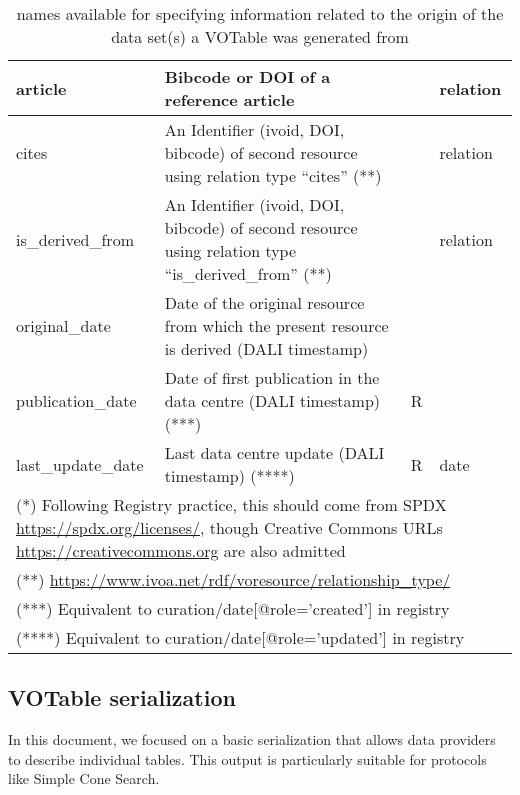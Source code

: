 \documentclass[11pt,a4paper]{ivoa}
\begin{document}
\begin{table}
{\begin{tabular}{|l|>{\raggedright}p{6cm}|l|l|}
article            & Bibcode or DOI of a reference article & & relation\\ \hline
cites              & An Identifier (ivoid, DOI, bibcode) of second resource
                     using relation type ``cites'' (**)& & relation\\ \hline
is\_derived\_from  & An Identifier (ivoid, DOI, bibcode) of second resource
                     using relation type ``is\_derived\_from'' (**)& & relation\\ \hline
%
original\_date     & Date of the original resource from which the present resource is derived (DALI timestamp) &    &  \\ \hline
publication\_date  & Date of first publication in the data centre  (DALI timestamp) (***) &  R &  \\ \hline
last\_update\_date & Last data centre update (DALI timestamp) (****) & R & date\\ \hline
\multicolumn{4}{p{\textwidth}}{\vskip2pt\footnotesize(*) Following Registry
practice, this should come from
SPDX \url{https://spdx.org/licenses/}, though Creative Commons URLs
\url{https://creativecommons.org} are also admitted}\\
\multicolumn{4}{p{\textwidth}}{\footnotesize(**) \url{https://www.ivoa.net/rdf/voresource/relationship\_type/}}\\
\multicolumn{4}{p{\textwidth}}{\footnotesize(***) Equivalent to curation/date[@role='created'] in registry}\\
\multicolumn{4}{p{\textwidth}}{\footnotesize(****) Equivalent to curation/date[@role='updated'] in registry}
\end{tabular}\hss}
\caption{ names available for specifying information
related to the origin of the data set(s) a VOTable was generated from}
\label{tab:origin-names}
\end{table}


\subsection{VOTable serialization}

In this document, we focused on a basic serialization that allows data
providers to describe individual tables.
This output is particularly suitable for protocols like Simple Cone Search.
\end{document}
